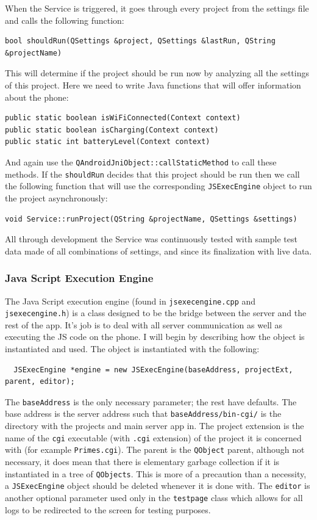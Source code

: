 \documentclass{article}
\begin{document}
When the Service is triggered, it goes through every project from the settings file and calls the following function:

\begin{verbatim}
bool shouldRun(QSettings &project, QSettings &lastRun, QString &projectName)
\end{verbatim}

This will determine if the project should be run now by analyzing all the settings of this project. Here we need to write Java functions that will offer information about the phone:

\begin{verbatim}
public static boolean isWiFiConnected(Context context)
public static boolean isCharging(Context context)
public static int batteryLevel(Context context)
\end{verbatim}

And again use the \texttt{QAndroidJniObject::callStaticMethod} to call these methods. If the \texttt{shouldRun} decides that this project should be run then we call the following function that will use the corresponding \texttt{JSExecEngine} object to run the project asynchronously:

\begin{verbatim}
void Service::runProject(QString &projectName, QSettings &settings)
\end{verbatim}

All through development the Service was continuously tested with sample test data made of all combinations of settings, and since its finalization with live data.

\subsubsection{Java Script Execution Engine}
The Java Script execution engine (found in \texttt{jsexecengine.cpp} and \texttt{jsexecengine.h}) is a class designed to be the bridge between
the server and the rest of the app. It's job is to deal with all server communication as well as executing the JS code on the phone.
I will begin by describing how the object is instantiated and used. The object is instantiated with the following:
\begin{verbatim}
  JSExecEngine *engine = new JSExecEngine(baseAddress, projectExt, parent, editor);
\end{verbatim}
The \texttt{baseAddress} is the only necessary parameter; the rest have defaults. The base address is the server address such that
\texttt{baseAddress/bin-cgi/} is the directory with the projects and main server app in. The project extension is the name of the
\texttt{cgi} executable (with \texttt{.cgi} extension) of the project it is concerned with (for example \texttt{Primes.cgi}).
The parent is the \texttt{QObject} parent, although not necessary, it does mean that there is elementary garbage collection if
it is instantiated in a tree of \texttt{QObjects}. This is more of a precaution than a necessity, a \texttt{JSExecEngine} object
should be deleted whenever it is done with. The \texttt{editor} is another optional parameter used only in the \texttt{testpage}
class which allows for all logs to be redirected to the screen for testing purposes.
\end{document}
